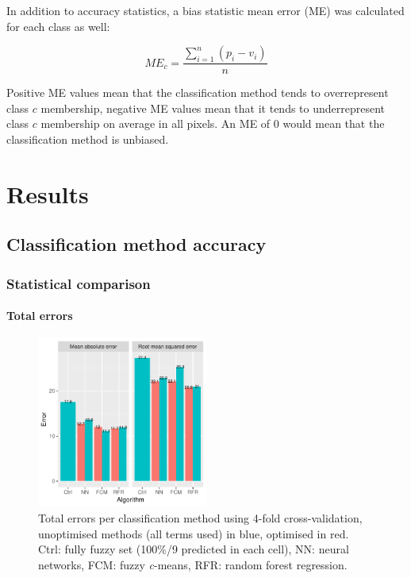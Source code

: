 \documentclass[a4paper,12pt]{scrbook}
\begin{document}
In addition to accuracy statistics, a bias statistic mean error (ME) was calculated for each class as well:

$$ ME_c = \frac{\displaystyle\sum_{i=1}^{n}{ (p_{i} - v_{i}) }}{n} $$

Positive ME values mean that the classification method tends to overrepresent class $c$ membership, negative ME values mean that it tends to underrepresent class $c$ membership on average in all pixels. An ME of 0 would mean that the classification method is unbiased.

\chapter{Results}

\section{Classification method accuracy}

\subsection{Statistical comparison}

\subsubsection{Total errors}

\begin{figure}
  \centering
  \includegraphics[width=0.5\textwidth]{../plot/total-errors}
  \caption{Total errors per classification method using 4-fold cross-validation, unoptimised methods (all terms used) in blue, optimised in red. Ctrl: fully fuzzy set (100\%/9 predicted in each cell), NN: neural networks, FCM: fuzzy \textit{c}-means, RFR: random forest regression.}
  \label{fig-total-errors}
\end{figure}
\end{document}
